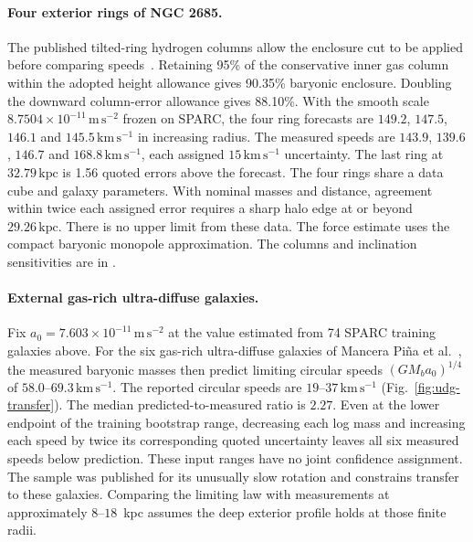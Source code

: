 \documentclass[11pt]{article}
\begin{document}
\paragraph{Four exterior rings of NGC 2685.}
The published tilted-ring hydrogen columns allow the enclosure cut to be
applied before comparing speeds~\cite{jozsa2685,denheijer2015}. Retaining
95\% of the conservative inner gas column within the adopted height
allowance gives 90.35\% baryonic enclosure. Doubling the downward
column-error allowance gives 88.10\%. With the smooth scale
$8.7504\times10^{-11}\,\mathrm{m\,s^{-2}}$ frozen on SPARC, the four
ring forecasts are $149.2$, $147.5$, $146.1$ and $145.5\,\mathrm{km\,s^{-1}}$
in increasing radius. The measured speeds are $143.9$, $139.6$, $146.7$
and $168.8\,\mathrm{km\,s^{-1}}$, each assigned $15\,\mathrm{km\,s^{-1}}$
uncertainty. The last ring at $32.79\,\mathrm{kpc}$ is 1.56 quoted errors
above the forecast. The four rings share a data cube and galaxy parameters.
With nominal masses and distance, agreement within twice each assigned
error requires a sharp halo edge at or beyond $29.26\,\mathrm{kpc}$.
There is no upper limit from these data. The force estimate uses the compact
baryonic monopole approximation. The columns and inclination sensitivities
are in .

\paragraph{External gas-rich ultra-diffuse galaxies.}
Fix $a_0=7.603\times10^{-11}\,\mathrm{m\,s^{-2}}$ at the value
estimated from 74 SPARC training galaxies above. For the six gas-rich
ultra-diffuse galaxies of Mancera Pi\~na et al.~\cite{mancera2019},
the measured baryonic masses then predict limiting circular speeds
$(G M_b a_0)^{1/4}$ of $58.0$--$69.3\,\mathrm{km\,s^{-1}}$.
The reported circular speeds are $19$--$37\,\mathrm{km\,s^{-1}}$
(Fig.~\ref{fig:udg-transfer}). The median predicted-to-measured ratio
is $2.27$. Even at the lower endpoint of the training bootstrap range,
decreasing each log mass and increasing each speed by twice its
corresponding quoted uncertainty leaves all six measured speeds
below prediction. These input ranges have no joint confidence
assignment. The sample was published for its unusually slow rotation
and constrains transfer to these galaxies. Comparing the limiting
law with measurements at approximately $8$--$18$~kpc assumes the
deep exterior profile holds at those finite radii.
\end{document}
